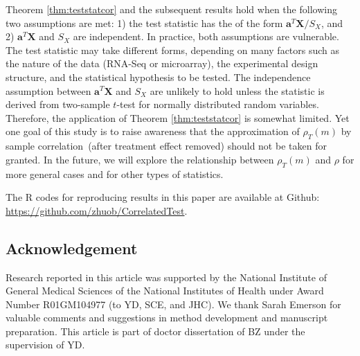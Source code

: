 \documentclass[12pt, a4paper]{article}
\newcommand{\samplecor}{sample correlation}
\begin{document}
	Theorem \ref{thm:teststatcor} and the subsequent results hold when the following two 
	assumptions are met: 1) the test statistic has the of 
	the form $\bm a^T\bm X/S_X$, and 2) $\bm a^T\bm X$ and $S_X$ are independent. In practice, both 
	assumptions are vulnerable.
	The test statistic may take different forms, depending on many factors such as the nature of 
	the data (RNA-Seq or microarray), the 
	experimental design structure, and the statistical hypothesis to be tested. The independence 
	assumption between $\bm a^T\bm X$ and $S_X$ are 
	unlikely to hold unless the statistic is derived from two-sample $t$-test for normally 
	distributed random variables. Therefore, the 
	application of Theorem \ref{thm:teststatcor} is somewhat limited. Yet one goal of this study is 
	to raise awareness that the approximation of $\rho_T(m)$ by \samplecor~(after treatment effect 
	removed) should not be taken for 
	granted. In the future, we will explore the relationship 
	between $\rho_T(m)$ and $\rho$ for more general cases and for other types of statistics. 
	
	The R codes for reproducing results in this paper are available at Github: 
	\url{https://github.com/zhuob/CorrelatedTest}.
	
	\subsection*{Acknowledgement}
	Research reported in this article was supported by the National Institute of General Medical 
	Sciences of the National Institutes of Health under Award Number R01GM104977 (to YD, SCE, and 
	JHC). 
	We thank Sarah Emerson for valuable comments and suggestions in method development and 
	manuscript preparation. This article is part of doctor dissertation of BZ under the supervision 
	of YD.
	
	\newpage

	
	
	
	
\end{document}
